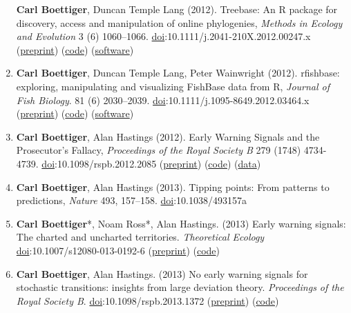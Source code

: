 \documentclass[11pt,a4paper,sans]{moderncv}        %
\begin{document}
\begin{enumerate}
  \textbf{Carl Boettiger}, Duncan Temple Lang (2012). Treebase: An R
  package for discovery, access and manipulation of online phylogenies,
  \emph{Methods in Ecology and Evolution} 3 (6) 1060--1066.
  \href{http://dx.doi.org/10.1111/j.2041-210X.2012.00247.x}{doi}:10.1111/j.2041-210X.2012.00247.x
  (\href{https://github.com/ropensci/treebase/blob/master/inst/doc/treebase/treebase_github.md}{preprint})
  (\href{https://github.com/ropensci/treebase}{code})
  (\href{http://cran.at.r-project.org/web/packages/treebase/}{software})
\item
  \textbf{Carl Boettiger}, Duncan Temple Lang, Peter Wainwright (2012).
  rfishbase: exploring, manipulating and visualizing FishBase data from
  R, \emph{Journal of Fish Biology}. 81 (6) 2030--2039.
  \href{http://dx.doi.org/10.1111/j.1095-8649.2012.03464.x}{doi}:10.1111/j.1095-8649.2012.03464.x
  (\href{https://github.com/ropensci/rfishbase/blob/master/inst/doc/rfishbase/rfishbase_github.md}{preprint})
  (\href{https://github.com/ropensci/rfishbase}{code})
  (\href{http://cran.at.r-project.org/web/packages/rfishbase/}{software})
\item
  \textbf{Carl Boettiger}, Alan Hastings (2012). Early Warning Signals
  and the Prosecutor's Fallacy, \emph{Proceedings of the Royal Society
  B} 279 (1748) 4734-4739.
  \href{http://dx.doi.org/10.1098/rspb.2012.2085}{doi}:10.1098/rspb.2012.2085
  (\href{http://arxiv.org/abs/1210.1204}{preprint})
  (\href{https://github.com/cboettig/prosecutors-fallacy}{code})
  (\href{http://dx.doi.org/10.5061/dryad.2k462}{data})
\item
  \textbf{Carl Boettiger}, Alan Hastings (2013). Tipping points: From
  patterns to predictions, \emph{Nature} 493, 157--158.
  \href{http://dx.doi.org/10.1038/493157a}{doi}:10.1038/493157a
\item
  \textbf{Carl Boettiger}*, Noam Ross*, Alan Hastings. (2013) Early
  warning signals: The charted and uncharted territories.
  \emph{Theoretical Ecology}
  \href{http://dx.doi.org/10.1007/s12080-013-0192-6}{doi}:10.1007/s12080-013-0192-6
  (\href{http://arxiv.org/abs/1305.6700}{preprint})
  (\href{https://github.com/cboettig/ews-review}{code})
\item
  \textbf{Carl Boettiger}, Alan Hastings. (2013) No early warning
  signals for stochastic transitions: insights from large deviation
  theory. \emph{Proceedings of the Royal Society B}.
  \href{http://dx.doi.org/10.1098/rspb.2013.1372}{doi}:10.1098/rspb.2013.1372
  (\href{http://arxiv.org/abs/1307.4415}{preprint})
  (\href{https://github.com/cboettig/prosecutors-fallacy}{code})

\end{enumerate}
\end{document}

